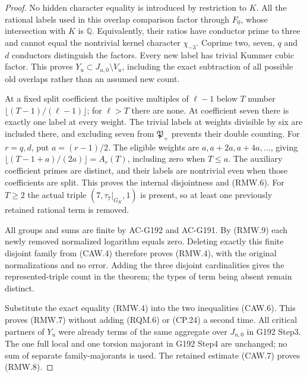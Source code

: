 \begin{proof}
No hidden character equality is introduced by restriction to $K$.
All the rational labels used in this overlap comparison factor
through $F_0$, whose intersection with $K$ is $\mathbb Q$.
Equivalently, their ratios have conductor prime to three and
cannot equal the nontrivial kernel character $\chi_{-3}$.
Coprime two, seven, $q$ and $d$ conductors distinguish the factors.
Every new label has trivial Kummer cubic factor. This proves
$Y_u\subset J_{u,0}\setminus V_u$, including the exact subtraction
of all possible old overlaps rather than an assumed new count.

At a fixed split coefficient the positive multiples of $\ell-1$
below $T$ number $\lfloor(T-1)/(\ell-1)\rfloor$; for $\ell>T$
there are none. At coefficient seven there is exactly one label
at every weight. The trivial labels at weights divisible by six
are included there, and excluding seven from $\mathfrak P_+$
prevents their double counting. For $r=q,d$, put $a=(r-1)/2$.
The eligible weights are $a,a+2a,a+4a,\ldots$, giving
$\lfloor(T-1+a)/(2a)\rfloor=A_r(T)$, including zero when $T\leq a$.
The auxiliary coefficient primes are distinct, and their labels
are nontrivial even when those coefficients are split.
This proves the internal disjointness and (RMW.6).
For $T\geq2$ the actual triple $(7,\tau_7|_{G_K},1)$ is present,
so at least one previously retained rational term is removed.

All groups and sums are finite by AC-G192 and AC-G191.
By (RMW.9) each newly removed normalized logarithm equals zero.
Deleting exactly this finite disjoint family from (CAW.4) therefore
proves (RMW.4), with the original normalizations and no error.
Adding the three disjoint cardinalities gives the represented-triple
count in the theorem; the types of term being absent remain distinct.

Substitute the exact equality (RMW.4) into the two inequalities
(CAW.6). This proves (RMW.7) without adding (RQM.6) or (CP.24)
a second time. All critical partners of $Y_u$ were already terms
of the same aggregate over $J_{u,0}$ in G192 Step3.
The one full local and one torsion majorant in G192 Step4 are
unchanged; no sum of separate family-majorants is used.
The retained estimate (CAW.7) proves (RMW.8).


\end{proof}
